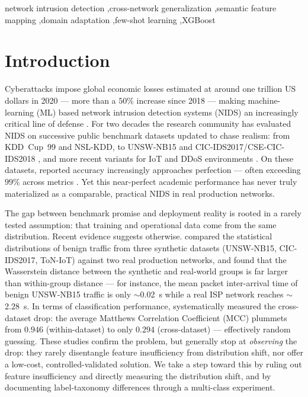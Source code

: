 \documentclass[preprint,12pt,authoryear]{elsarticle}
\begin{document}
\begin{frontmatter}
\begin{keyword}
network intrusion detection \sep cross-network generalization \sep semantic
feature mapping \sep domain adaptation \sep few-shot learning \sep XGBoost
\end{keyword}

\end{frontmatter}

\section{Introduction}
\label{sec:intro}

Cyberattacks impose global economic losses estimated at around one trillion US
dollars in 2020 --- more than a $50\%$ increase since 2018
\citep{cremer} --- making machine-learning (ML) based network intrusion detection
systems (NIDS) an increasingly critical line of defense
\citep{torres,sarker,khraisat,buczak,bhuyan}. For two decades the research
community has evaluated NIDS on successive public benchmark datasets updated to
chase realism: from KDD~Cup~99 \citep{kdd} and NSL-KDD, to UNSW-NB15
\citep{unsw,unsweval} and CIC-IDS2017/CSE-CIC-IDS2018 \citep{cicids}, and more
recent variants for IoT and DDoS environments
\citep{botiot,toniot,ciciot,cicddos,ring}. On these datasets, reported accuracy
increasingly approaches perfection --- often exceeding $99\%$ across metrics
\citep{layeghy}. Yet this near-perfect academic performance has never truly
materialized as a comparable, practical NIDS in real production networks.

The gap between benchmark promise and deployment reality is rooted in a rarely
tested assumption: that training and operational data come from the same
distribution. Recent evidence suggests otherwise. \citet{layeghy} compared the
statistical distributions of benign traffic from three synthetic datasets
(UNSW-NB15, CIC-IDS2017, ToN-IoT) against two real production networks, and found
that the Wasserstein distance \citep{wasserstein} between the synthetic and
real-world groups is far larger than within-group distance --- for instance, the
mean packet inter-arrival time of benign UNSW-NB15 traffic is only
$\sim$\SI{0.02}{\second} while a real ISP network reaches
$\sim$\SI{2.28}{\second}. In terms of classification performance, \citet{cantone}
systematically measured the cross-dataset drop: the average Matthews Correlation
Coefficient (MCC) plummets from $0.946$ (within-dataset) to only $0.294$
(cross-dataset) --- effectively random guessing. These studies
\citep{cantone,layeghy,dhooge,verkerken} confirm the problem, but generally stop
at \emph{observing} the drop: they rarely disentangle feature insufficiency from
distribution shift, nor offer a low-cost, controlled-validated solution. We take a
step toward this by ruling out feature insufficiency and directly measuring the
distribution shift, and by documenting label-taxonomy differences through a
multi-class experiment.
\end{document}

